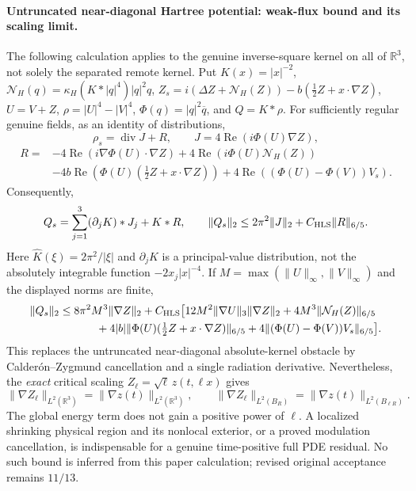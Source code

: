 \paragraph{Untruncated near-diagonal Hartree potential: weak-flux bound and its scaling limit.}
The following calculation applies to the genuine inverse-square kernel on all of
$\mathbb R^3$, not solely the separated remote kernel. Put
$K(x)=|x|^{-2}$,
$\mathcal N_H(q)=\kappa_H(K*|q|^4)|q|^2q$,
$Z_s=i(\Delta Z+\mathcal N_H(Z))-b(\frac12Z+x\cdot\nabla Z)$,
$U=V+Z$, $\rho=|U|^4-|V|^4$,
$\Phi(q)=|q|^2\overline q$, and $Q=K*\rho$.
For sufficiently regular genuine fields, as an identity of distributions,
\[
 \rho_s=\operatorname{div}J+R,\qquad J=4\operatorname{Re}(i\Phi(U)\nabla Z),
\]
\begin{align*}
 R={}&-4\operatorname{Re}(i\nabla\Phi(U)\cdot\nabla Z)
  +4\operatorname{Re}(i\Phi(U)\mathcal N_H(Z))\\
 &-4b\operatorname{Re}(\Phi(U)(\tfrac12Z+x\cdot\nabla Z))
  +4\operatorname{Re}((\Phi(U)-\Phi(V))V_s).
\end{align*}
Consequently,
\[
 Q_s=\sum_{j=1}^3(\partial_jK)*J_j+K*R,\qquad
 \|Q_s\|_2\le2\pi^2\|J\|_2+C_{\rm HLS}\|R\|_{6/5}.
\]
Here $\widehat K(\xi)=2\pi^2/|\xi|$ and
$\partial_jK$ is a principal-value distribution, not the absolutely
integrable function $-2x_j|x|^{-4}$.
If $M=\max(\|U\|_\infty,\|V\|_\infty)$ and the displayed norms are finite,
\begin{align*}
\|Q_s\|_2\le{}&
8\pi^2M^3\|\nabla Z\|_2+C_{\rm HLS}\big[
12M^2\|\nabla U\|_3\|\nabla Z\|_2
+4M^3\|\mathcal N_H(Z)\|_{6/5}\\
&\qquad+4|b|\|\Phi(U)(\tfrac12Z+x\cdot\nabla Z)\|_{6/5}
+4\|(\Phi(U)-\Phi(V))V_s\|_{6/5}\big].
\end{align*}
This replaces the untruncated near-diagonal absolute-kernel obstacle
by Calder\'on--Zygmund cancellation and a single radiation derivative.
Nevertheless, the \emph{exact} critical scaling
$Z_\ell=\sqrt\ell\,z(t,\ell x)$ gives
\[
 \|\nabla Z_\ell\|_{L^2(\mathbb R^3)}
 =\|\nabla z(t)\|_{L^2(\mathbb R^3)},\qquad
 \|\nabla Z_\ell\|_{L^2(B_R)}
 =\|\nabla z(t)\|_{L^2(B_{\ell R})}.
\]
The global energy term does not gain a positive power of $\ell$.
A localized shrinking physical region and its nonlocal exterior,
or a proved modulation cancellation, is indispensable for a genuine
time-positive full PDE residual. No such bound is inferred from this
paper calculation; revised original acceptance remains $11/13$.
